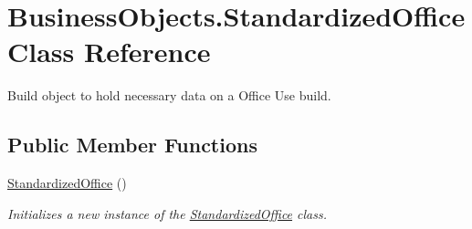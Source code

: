 \hypertarget{class_business_objects_1_1_standardized_office}{}\section{Business\+Objects.\+Standardized\+Office Class Reference}
\label{class_business_objects_1_1_standardized_office}


Build object to hold necessary data on a Office Use build.  


\subsection*{Public Member Functions}
\begin{DoxyCompactItemize}
\item 
\hyperlink{class_business_objects_1_1_standardized_office_a275dde86acedc53982daf7aef92e934a}{Standardized\+Office} ()
\begin{DoxyCompactList}\small\item\em Initializes a new instance of the \hyperlink{class_business_objects_1_1_standardized_office}{Standardized\+Office} class. \end{DoxyCompactList}\end{DoxyCompactItemize}
